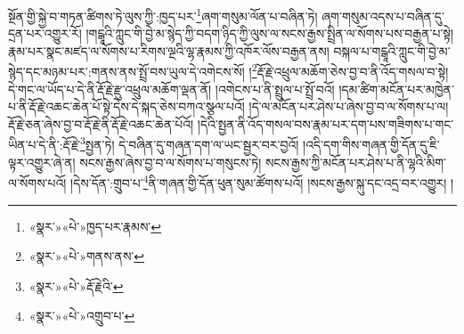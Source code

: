 སྔོན་གྱི་སྐྱེ་བ་གཏན་ཚིགས་ཏེ་ལུས་ཀྱི་:ཁྱད་པར་\footnote{«སྣར་»«པེ་»ཁྱད་པར་རྣམས་}ཞག་གསུམ་ལོན་པ་བཞིན་ཏེ། ཞག་གསུམ་འདས་པ་བཞིན་དུ་དྲན་པར་འགྱུར་རོ། །གངྒཱའི་ཀླུང་གི་བྱེ་མ་སྙེད་ཀྱི་བདག་ཉིད་ཀྱི་ལུས་ལ་སངས་རྒྱས་སྤྲིན་ལ་སོགས་པས་བརྒྱན་པ་སྟེ། རྣམ་པར་སྣང་མཛད་ལ་སོགས་པ་རིགས་ལྔའི་ལྷ་རྣམས་ཀྱི་འཁོར་ལོས་བརྒྱན་ནས། བསྐལ་པ་གངྒཱའི་ཀླུང་གི་བྱེ་མ་སྙེད་དང་མཉམ་པར་:གནས་ནས་སྤྲོ་བས་ཡུལ་དེ་འགེངས་སོ། །\footnote{«སྣར་»«པེ་»གནས་ནས་}རྡོ་རྗེ་འཕྲུལ་མཆོག་ཅེས་བྱ་བ་ནི་འོད་གསལ་བ་སྟེ། དེ་གང་ལ་ཡོད་པ་དེ་ནི་རྡོ་རྗེ་རྫུ་འཕྲུལ་མཆོག་ལྡན་ནོ། །འགེངས་པ་ནི་སྤྲུལ་པ་སྤྲོ་བའོ། །དམ་ཚིག་མངོན་པར་མཁྱེན་པ་ནི་རྡོ་རྗེ་འཆང་ཆེན་པོ་སྟེ་དེས་དེ་སྐད་ཅེས་བཀའ་སྩལ་པའོ། །དེ་ལ་མངོན་པར་ཤེས་པ་ཞེས་བྱ་བ་ལ་སོགས་པ་ལ། རྡོ་རྗེ་ཅན་ཞེས་བྱ་བ་རྡོ་རྗེ་ནི་རྡོ་རྗེ་འཆང་ཆེན་པོའོ། །དེའི་སྤྱན་ནི་འོད་གསལ་བས་རྣམ་པར་དག་པས་གཟིགས་པ་གང་ཡིན་པ་དེ་ནི་:རྡོ་རྗེ་\footnote{«སྣར་»«པེ་»རྡོ་རྗེའི་}སྤྱན་ཏེ། དེ་བཞིན་དུ་གཞན་དག་ལ་ཡང་སྦྱར་བར་བྱའོ། །འདི་དག་གིས་གཞན་གྱི་དོན་དུ་ཇི་ལྟར་འགྱུར་ཞེ་ན། སངས་རྒྱས་ཞེས་བྱ་བ་ལ་སོགས་པ་གསུངས་ཏེ། སངས་རྒྱས་ཀྱི་མངོན་པར་ཤེས་པ་ནི་ལྷའི་མིག་ལ་སོགས་པའོ། །དེས་དོན་:གྲུབ་པ་\footnote{«སྣར་»«པེ་»འགྲུབ་པ་}ནི་གཞན་གྱི་དོན་ཕུན་སུམ་ཚོགས་པའོ། །སངས་རྒྱས་སྐུ་དང་འདྲ་བར་འགྱུར། །
